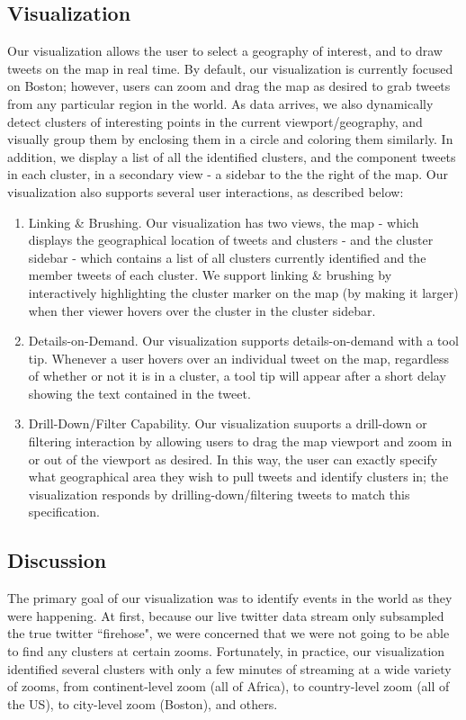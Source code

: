 \documentclass[pdftex,12pt,a4paper]{article}
\begin{document}
\subsection{Visualization}
Our visualization allows the user to select a geography of interest, and to draw tweets on the map in real time. By default, our visualization is currently focused on Boston; however, users can zoom and drag the map as desired to grab tweets from any particular region in the world. As data arrives, we also dynamically detect clusters of interesting points in the current viewport/geography, and visually group them by enclosing them in a circle and coloring them similarly. In addition, we display a list of all the identified clusters, and the component tweets in each cluster, in a secondary view - a sidebar to the the right of the map. Our visualization also supports several user interactions, as described below:
\begin{enumerate}
\item Linking \& Brushing. Our visualization has two views, the map - which displays the geographical location of tweets and clusters - and the cluster sidebar - which contains a list of all clusters currently identified and the member tweets of each cluster. We support linking \& brushing by interactively highlighting the cluster marker on the map (by making it larger) when ther viewer hovers over the cluster in the cluster sidebar. 
\item Details-on-Demand. Our visualization supports details-on-demand with a tool tip. Whenever a user hovers over an individual tweet on the map, regardless of whether or not it is in a cluster, a tool tip will appear after a short delay showing the text contained in the tweet. 
\item Drill-Down/Filter Capability. Our visualization suuports a drill-down or filtering interaction by allowing users to drag the map viewport and zoom in or out of the viewport as desired. In this way, the user can exactly specify what geographical area they wish to pull tweets and identify clusters in; the visualization responds by drilling-down/filtering tweets to match this specification.
\end{enumerate}

\subsection{Discussion}
The primary goal of our visualization was to identify events in the world as they were happening. At first, because our live twitter data stream only subsampled the true twitter ``firehose", we were concerned that we were not going to be able to find any clusters at certain zooms. Fortunately, in practice, our visualization identified several clusters with only a few minutes of streaming at a wide variety of zooms, from continent-level zoom (all of Africa), to country-level zoom (all of the US), to city-level zoom (Boston), and others. 
\end{document}
